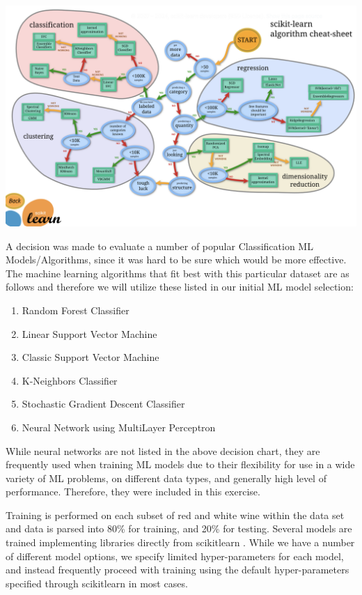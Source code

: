 \documentclass[titlepage]{article}
\begin{document}
		\includegraphics[width=.95\textwidth]{img/sklearncheatsheet.png}
		
		A decision was made to evaluate a number of popular Classification ML Models/Algorithms, since it was hard to be sure which would be more effective.  The machine learning algorithms that fit best with this particular dataset are as follows and therefore we will utilize these listed in our initial ML model selection:
	
	\begin{enumerate}
		\item Random Forest Classifier
		\item Linear Support Vector Machine
		\item Classic Support Vector Machine
		\item K-Neighbors Classifier
		\item Stochastic Gradient Descent Classifier
		\item Neural Network using MultiLayer Perceptron
	\end{enumerate}
	
		While neural networks are not listed in the above decision chart, they are frequently used when training ML models due to their flexibility for use in a wide variety of ML problems, on different data types, and generally high level of performance. Therefore, they were included in this exercise.  
		
		Training is performed on each subset of red and white wine within the data set and data is parsed into 80\% for training, and 20\% for testing.  Several models are trained implementing libraries directly from scikitlearn \cite{scikitlearn}.  While we have a number of different model options, we specify limited hyper-parameters for each model, and instead frequently proceed with training using the default hyper-parameters specified through scikitlearn in most cases.  
		
\end{document}
